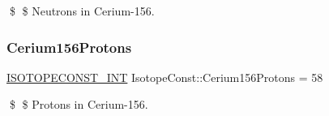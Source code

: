 \$ \$ Neutrons in Cerium-\/156. \mbox{\label{group___isotope_const-_cerium-_ce156_ga3f0a3e10e1fc64c825f1cb240f2c8668}} 
\subsubsection{\texorpdfstring{Cerium156\+Protons}{Cerium156Protons}}
{\footnotesize\ttfamily \mbox{\hyperlink{group___isotope_const-_macros_ga5f18360b3e99483a35c32d789e62621c}{I\+S\+O\+T\+O\+P\+E\+C\+O\+N\+S\+T\+\_\+\+I\+NT}} Isotope\+Const\+::\+Cerium156\+Protons = 58}

\$ \$ Protons in Cerium-\/156. 